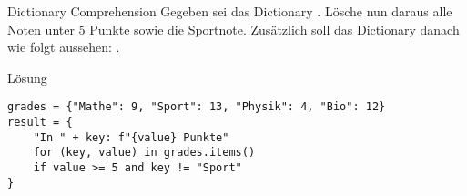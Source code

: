 \begin{fragile}[Übung]

\begin{block}{Dictionary Comprehension}
\vspace{2pt}
Gegeben sei das Dictionary 
. 
Lösche nun daraus alle Noten unter 5 Punkte sowie die Sportnote. Zusätzlich soll das Dictionary danach wie folgt aussehen: 
. 

\end{block}


\vspace{12pt}

\begin{solutionblock}{Lösung}
\begin{verbatim}
grades = {"Mathe": 9, "Sport": 13, "Physik": 4, "Bio": 12}
result = {
    "In " + key: f"{value} Punkte"
    for (key, value) in grades.items()
    if value >= 5 and key != "Sport"
}
\end{verbatim}
\end{solutionblock}

\end{fragile}


























































